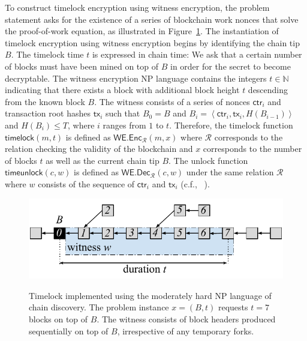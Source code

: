 To construct timelock encryption using witness encryption, the problem statement asks for the
existence of a series of blockchain work nonces that solve the proof-of-work equation, as illustrated
in Figure~\ref{fig.blockchain-timelock}.
The instantiation of timelock encryption using witness encryption
begins by identifying the chain tip $B$. The timelock time $t$
is expressed in chain time: We ask that a certain number of blocks must have been mined on top of $B$
in order for the secret to become decryptable. The witness encryption \textsc{NP} language contains
the integers $t \in \mathbb{N}$ indicating that there exists a block with additional block height
$t$ descending from the known block $B$. The witness consists of a series of nonces $\textsf{ctr}_i$
and transaction root hashes $\textsf{tx}_i$ such that
$B_0 = B$ and
$B_i = \left<\textsf{ctr}_i, \textsf{tx}_i, H(B_{i-1})\right>$
and $H(B_i) \leq T$,
where $i$ ranges from $1$ to $t$. Therefore, the timelock function $\textsf{timelock}(m, t)$ is defined
as $\textsf{WE.Enc}_\mathcal{R}(m, x)$ where $\mathcal{R}$ corresponds to the relation checking the
validity of the blockchain and $x$ corresponds to the number of blocks $t$ as well as the current
chain tip $B$. The unlock function $\textsf{timeunlock}(c, w)$ is defined as
$\textsf{WE.Dec}_\mathcal{R}(c, w)$ under the same relation $\mathcal{R}$ where $w$ consists of
the sequence of $\textsf{ctr}_i$ and $\textsf{tx}_i$ (c.f., ~\cite{timelock-bitcoin}).

\begin{figure}[ht]
    \caption{Timelock implemented using the moderately hard \textsc{NP} language of chain discovery.
             The problem instance $x = (B, t)$ requests $t = 7$ blocks on top of $B$. The witness
             consists of block headers produced sequentially on top of $B$, irrespective of any
             temporary forks.}
    \centering
    \includegraphics[width=0.55 \columnwidth,keepaspectratio]{figures/blockchain-timelock.pdf}
    \label{fig.blockchain-timelock}
\end{figure}

